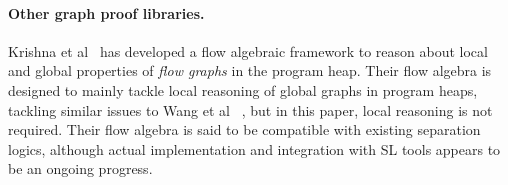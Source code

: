 \paragraph{Other graph proof libraries.} Krishna et al~\cite{DBLP:conf/esop/KrishnaSW20} has developed a flow algebraic framework to reason about local and global properties of \textit{flow graphs} in the program heap. Their flow algebra is designed to mainly tackle local reasoning of global graphs in program heaps, tackling similar issues to Wang et al ~\cite{DBLP:journals/pacmpl/WangCMH19}, but in this paper, local reasoning is not required. Their flow algebra is said to be compatible with existing separation logics, although actual implementation and integration with SL tools appears to be an ongoing progress.



